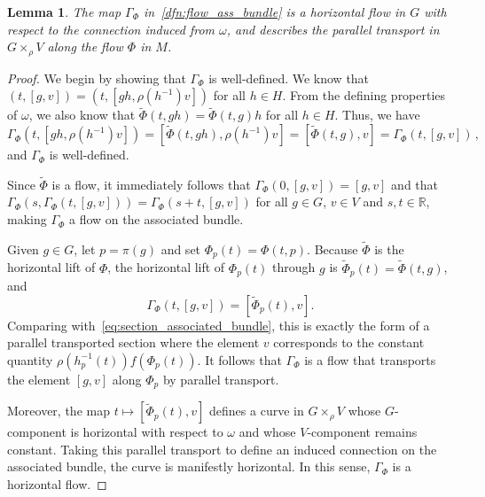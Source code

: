 \documentclass[12pt,a4paper]{article}
\numberwithin{equation}{section}
\theoremstyle{plain}
\newtheorem{lemma}[theorem]{Lemma}
\theoremstyle{definition}
\theoremstyle{remark}
\begin{document}
\begin{lemma}\label{lem:flow_ass_bundle}
    The map $\Gamma_{\Phi}$ in~\cref{dfn:flow_ass_bundle} is a horizontal flow in $G$ with respect to the connection induced from $\omega$, and describes the parallel transport in $G \times_{\rho} V$ along the flow $\Phi$ in $M$.    
\end{lemma}
\begin{proof}
    We begin by showing that $\Gamma_\Phi$ is well-defined. We know that $(t,[g,v])=(t,[gh,\rho(h^{-1})v])$ for all $h\in H$. From the defining properties of $\omega$, we also know that $\tilde{\Phi}(t,gh)=\tilde{\Phi}(t,g)h$ for all $h\in H$. Thus, we have
    \begin{equation}
        \Gamma_\Phi(t,[gh,\rho(h^{-1})v]) = [\tilde{\Phi}(t,gh),\rho(h^{-1})v] = [\tilde{\Phi}(t,g),v] = \Gamma_\Phi(t,[g,v])\,,
    \end{equation}
    and $\Gamma_\Phi$ is well-defined.

    Since $\tilde{\Phi}$ is a flow, it immediately follows that $\Gamma_\Phi(0,[g,v])=[g,v]$ and that $\Gamma_\Phi(s,\Gamma_\Phi(t,[g,v]))=\Gamma_\Phi(s+t,[g,v])$ for all $g\in G$, $v\in V$ and $s,t\in\mathbb{R}$, making $\Gamma_\Phi$ a flow on the associated bundle.

    Given $g\in G$, let $p=\pi(g)$ and set $\Phi_p(t)=\Phi(t,p)$. Because $\tilde{\Phi}$ is the horizontal lift of $\Phi$, the horizontal lift of $\Phi_p(t)$ through $g$ is $\tilde{\Phi}_p(t)=\tilde{\Phi}(t,g)$, and
    \begin{equation}
        \Gamma_\Phi(t,[g,v])=[\tilde{\Phi}_p(t),v].
    \end{equation}
    Comparing with~\cref{eq:section_associated_bundle}, this is exactly the form of a parallel transported section where the element $v$ corresponds to the constant quantity $\rho(h_p^{-1}(t))f(\Phi_p(t))$. It follows that $\Gamma_\Phi$ is a flow that transports the element $[g,v]$ along $\Phi_p$ by parallel transport. 

    Moreover, the map $t\mapsto [\tilde{\Phi}_p(t),v]$ defines a curve in $G\times_\rho V$ whose $G$-component is horizontal with respect to $\omega$ and whose $V$-component remains constant. Taking this parallel transport to define an induced connection on the associated bundle, the curve is manifestly horizontal. In this sense, $\Gamma_\Phi$ is a horizontal flow.
\end{proof} 
\end{document}
